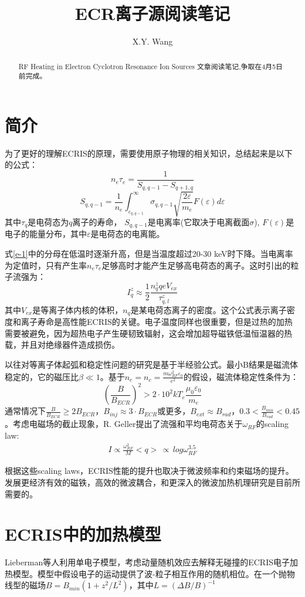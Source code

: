 \documentclass[fontset=windows]{article}
\title{ECR离子源阅读笔记}
\author{X.Y. Wang}
\begin{document}
\maketitle

\begin{abstract}
RF Heating in Electron Cyclotron Resonance Ion Sources 文章阅读笔记,争取在4月5日前完成。
\end{abstract}

\section{简介}
为了更好的理解ECRIS的原理，需要使用原子物理的相关知识，总结起来是以下的公式：
\begin{equation}
    n_e\tau_e=\frac{1}{S_{q,q-1}-S_{q+1,q}}
    \label{e-1}
\end{equation}
\begin{equation}
    S_{q,q-1}=\frac{1}{n_e}\int_{\varepsilon_{q,q-1}}^{\infty}\sigma_{q,q-1}\sqrt{\frac{2\varepsilon}{m_e}}F(\varepsilon)d\varepsilon
    \label{e-2}
\end{equation}
其中$\tau_q$是电荷态为$q$离子的寿命， $S_{q,q-1}$是电离率(它取决于电离截面$\sigma$), $F(\varepsilon)$是电子的能量分布，其中$\varepsilon$是电荷态的电离能。

式\ref{e-1}中的分母在低温时逐渐升高，但是当温度超过20-30 keV时下降。当电离率为定值时，只有产生率$n_e\tau_e$足够高时才能产生足够高电荷态的离子。这时引出的粒子流强为：
\begin{equation}
    I_q^z\approx\frac{1}{2}\frac{n_q^zqeV_{ex}}{\tau_{q,l}^z}
\end{equation}
其中$V_{ex}$是等离子体内核的体积，$n_q$是某电荷态离子的密度。这个公式表示离子密度和离子寿命是高性能ECRIS的关键。电子温度同样也很重要，但是过热的加热需要被避免，因为超热电子产生硬韧致辐射，这会增加超导磁铁低温恒温器的热载，并且对绝缘器件造成损伤。

以往对等离子体起弧和稳定性问题的研究是基于半经验公式。最小B结果是磁流体稳定的，它的磁压比$\beta\ll1$。基于$n_e=n_c=\frac{m\omega_{RF}^2\varepsilon_0}{e^2}$的假设，磁流体稳定性条件为：
\begin{equation}
    (\frac{B}{B_{ECR}})^2>2\cdot10^2kT_e\frac{\mu_0\varepsilon_0}{m_e}
\end{equation}
通常情况下$\frac{B}{B_{ECR}}\geq2B_{ECR}$，$B_{inj}\approx3\cdot B_{ECR}$或更多，$B_{ext}\approx B_{rad}$，$0.3<\frac{B_{min}}{B_{rad}}<0.45$。考虑电磁场的截止现象，R. Geller提出了流强和平均电荷态关于$\omega_{RF}$的scaling law:
\begin{align}
    I\propto\frac{\omega_{RF}^2}{M}
    <q>\,\propto\, log\omega_{RF}^{3.5}
\end{align}

根据这些scaling laws，ECRIS性能的提升也取决于微波频率和约束磁场的提升。发展更经济有效的磁铁，高效的微波耦合，和更深入的微波加热机理研究是目前所需要的。

\section{ECRIS中的加热模型}
Lieberman等人利用单电子模型，考虑动量随机效应去解释无碰撞的ECRIS电子加热模型。模型中假设电子的运动提供了波-粒子相互作用的随机相位。在一个抛物线型的磁场$B=B_{min}(1+z^2/L^2)$，其中$L=(\Delta B/ B)^{-1}$




\end{document}
